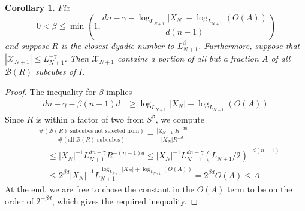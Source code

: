 \documentclass{article}
\theoremstyle{plain}
\newtheorem*{corollary}{Corollary}
\theoremstyle{plain}
\begin{document}
\begin{multicols}{2}
\begin{corollary}
	Fix
	\[ 0 < \beta \leq \min \left( 1, \frac{dn - \gamma - \log_{L_{N+1}} |X_N| - \log_{L_{N+1}}(O(A))}{d(n-1)} \right) \]
	and suppose $R$ is the closest dyadic number to $L_{N+1}^\beta$. Furthermore, suppose that $|\mathcal{X}_{N+1}| \leq L_{N+1}^{-\gamma}$. Then $\mathcal{X}_{N+1}$ contains a portion of all but a fraction $A$ of all $\mathcal{B}(R)$ subcubes of $I$.
\end{corollary}
\begin{proof}
	The inequality for $\beta$ implies
	\begin{align*}
		dn - \gamma - \beta(n-1)d &\geq \log_{L_{N+1}} |X_N| + \log_{L_{N+1}}(O(A))
	\end{align*}
	Since $R$ is within a factor of two from $S^\beta$, we compute
	\begin{align*}
		&\frac{\# (\text{$\mathcal{B}(R)$ subcubes not selected from})}{\# (\text{all $\mathcal{B}(R)$ subcubes})} = \frac{|Z_{N+1}| R^{-dn}}{|X_N|R^{-d}}\\
		&\ \ \ \ \ \leq |X_N|^{-1} L_{N+1}^{dn - \gamma} R^{-(n-1)d} \leq |X_N|^{-1} L_{N+1}^{dn - \gamma} (L_{N+1}/2)^{-d(n-1)}\\
		&\ \ \ \ \ \leq 2^{\beta d}|X_N|^{-1} L_{N+1}^{\log_{L_{N+1}}|X_N| + \log_{L_{N+1}}(O(A))} = 2^{\beta d} O(A) \leq A.
	\end{align*}
	At the end, we are free to chose the constant in the $O(A)$ term to be on the order of $2^{-\beta d}$, which gives the required inequality.
\end{proof}





\end{multicols}
\end{document}

